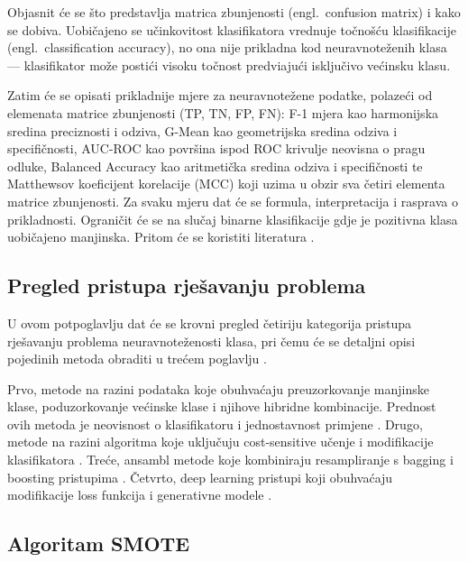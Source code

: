Objasnit \'{c}e se \v{s}to predstavlja matrica zbunjenosti (engl.\
confusion matrix) i kako se dobiva. Uobi\v{c}ajeno se u\v{c}inkovitost
klasifikatora vrednuje to\v{c}no\v{s}\'{c}u klasifikacije (engl.\
classification accuracy), no ona nije prikladna kod neuravnote\v{z}enih
klasa --- klasifikator mo\v{z}e posti\'{c}i visoku to\v{c}nost
predvi\dj{}aju\'{c}i isklju\v{c}ivo ve\'{c}insku klasu.

Zatim \'{c}e se opisati prikladnije mjere za neuravnote\v{z}ene podatke,
polaze\'{c}i od elemenata matrice zbunjenosti (TP, TN, FP, FN):
F-1 mjera kao harmonijska sredina preciznosti i odziva, G-Mean
kao geometrijska sredina odziva i specifi\v{c}nosti, AUC-ROC kao povr\v{s}ina
ispod ROC krivulje neovisna o pragu odluke, Balanced Accuracy kao
aritmeti\v{c}ka sredina odziva i specifi\v{c}nosti te Matthewsov
koeficijent korelacije (MCC) koji uzima u obzir sva \v{c}etiri elementa
matrice zbunjenosti. Za svaku mjeru dat \'{c}e se formula, interpretacija
i rasprava o prikladnosti. Ograni\v{c}it \'{c}e se na slu\v{c}aj binarne
klasifikacije gdje je pozitivna klasa uobi\v{c}ajeno manjinska.
Pritom \'{c}e se koristiti literatura \cite{sokolova2009,japkowicz2011,lopez2013,he2009}.

\subsection{Pregled pristupa rje\v{s}avanju problema}

U ovom potpoglavlju dat \'{c}e se krovni pregled \v{c}etiriju kategorija
pristupa rje\v{s}avanju problema neuravnote\v{z}enosti klasa, pri \v{c}emu
\'{c}e se detaljni opisi pojedinih metoda obraditi u tre\'{c}em poglavlju
\cite{fernandez2018book}.

Prvo, metode na razini podataka koje obuhva\'{c}aju
preuzorkovanje manjinske klase, poduzorkovanje ve\'{c}inske klase i
njihove hibridne kombinacije. Prednost ovih metoda je neovisnost o
klasifikatoru i jednostavnost primjene \cite{bajer2019,dudjak2020}.
Drugo, metode na razini algoritma koje uklju\v{c}uju cost-sensitive
u\v{c}enje i modifikacije klasifikatora \cite{elkan2001}. Tre\'{c}e,
ansambl metode koje kombiniraju resampliranje s bagging i boosting
pristupima \cite{galar2012}. \v{C}etvrto, deep learning pristupi koji
obuhva\'{c}aju modifikacije loss funkcija \cite{lin2017} i generativne
modele \cite{goodfellow2014}.

\subsection{Algoritam SMOTE}


